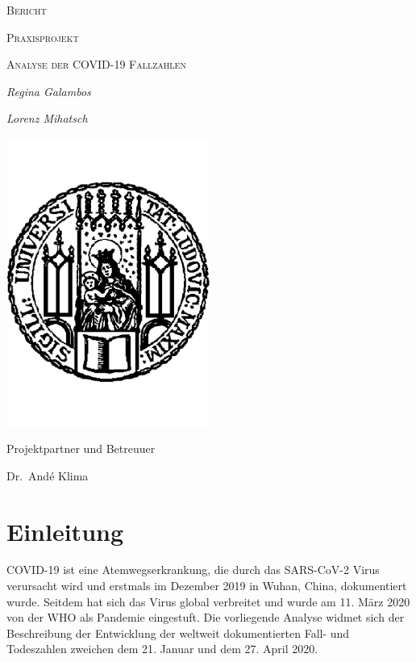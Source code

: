\documentclass[12pt, a4paper]{article}
\begin{document}

\begin{titlepage}
	\centering
	{\scshape\Large Bericht \par}
	\vspace{0.5cm}
	{\scshape Praxisprojekt \par}
	\vspace{1.0cm}
	{\scshape\LARGE Analyse der COVID-19 Fallzahlen
 \par}
 	\vspace{2cm}
	{\Large\itshape Regina Galambos\par}
	{\Large\itshape Lorenz Mihatsch\par}
	\vspace{2cm}

	\includegraphics[width=0.5\textwidth]{LMU.pdf}\\


	\vspace{1cm}
	{Projektpartner und Betreuuer\par
	 Dr.\ And\'{e} Klima\par}
\end{titlepage}

\section{Einleitung}
COVID-19 ist eine Atemwegserkrankung, die durch das SARS-CoV-2 Virus verursacht wird und erstmals im Dezember 2019 in Wuhan, China, dokumentiert wurde. Seitdem hat sich das Virus global verbreitet und wurde am 11. März 2020 von der WHO als Pandemie eingestuft. Die vorliegende Analyse widmet sich der Beschreibung der Entwicklung der weltweit dokumentierten Fall- und Todeszahlen zweichen dem 21. Januar und dem 27. April 2020.
\end{document}
